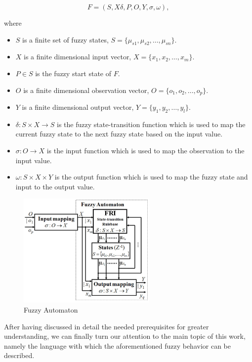 \[
	F = (S, X \delta, P, O, Y, \sigma, \omega),
\]

\noindent where

\begin{itemize}
	\item $S$ is a finite set of fuzzy states, $S = \{\mu_{s1}, \mu_{s2}, \ldots, \mu_{sn}\}$.
	\item $X$ is a finite dimensional input vector, $X = \{x_1, x_2, \ldots, x_m\}$.
	\item $P \in S$ is the fuzzy start state of $F$.
	\item  $O$ is a finite dimensional observation vector, $O = \{o_1, o_2, \ldots, o_p\}$.
	\item $Y$ is a finite dimensional output vector, $Y = \{y_1, y_2, \ldots, y_l\}$.
	\item $\delta : S \times X \rightarrow S$ is the fuzzy state-transition function which is used to map the current fuzzy state to the next fuzzy state based on the input value.
	\item $\sigma : O \rightarrow X$ is the input function which is used to map the observation to the input value.
	\item $\omega : S \times X \times Y$ is the output function which is used to map the fuzzy state and input to the output value.
\end{itemize}

\begin{figure}[!h]
	\centering
	\includegraphics[width=0.6\textwidth]{images/fuzzy_automaton}
	\caption{Fuzzy Automaton}
	\label{fig:automaton}
\end{figure}

After having discussed in detail the needed prerequisites for greater understanding, we can finally turn our attention to the main topic of this work, namely the language with which the aforementioned fuzzy behavior can be described. 


